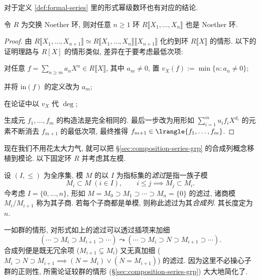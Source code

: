 对于定义 \ref{def:formal-series} 里的形式幂级数环也有对应的结论.
\begin{theorem}
	令 $R$ 为交换 Noether 环, 则对任意 $n \geq 1$ 环 $R\llbracket X_1, \ldots, X_n \rrbracket$ 也是 Noether 环.
\end{theorem}
\begin{proof}
	由 $R \llbracket X_1, \ldots, X_{n+1}\rrbracket \simeq R \llbracket X_1, \ldots, X_n \rrbracket \llbracket X_{n+1}\rrbracket$ 化约到环 $R \llbracket X \rrbracket$ 的情形. 以下的证明理路与 $R[X]$ 的情形类似, 差异在于要考虑最低次项:
	\begin{compactitem}
		\item 对任意 $f = \sum_{n \geq m} a_n X^n \in R\llbracket X \rrbracket$, 其中 $a_m \neq 0$, 置 $v_X(f) := \min\{n: a_n \neq 0\}$;
		\item 并将 $\text{in}(f)$ 的定义改为 $a_m$;
		\item 在论证中以 $v_X$ 代 $\deg$;
	\end{compactitem}
	生成元 $f_1, \ldots, f_m$ 的构造法是完全相同的. 最后一步改为用形如 $\sum_{i=1}^m u_i f_i X^{d_i}$ 的元素不断消去 $f_{m+1}$ 的最低次项, 最终推得 $f_{m+1} \in \lrangle{f_1, \ldots, f_m}$.
\end{proof}

现在我们不用花太大力气, 就可以把 \S\ref{sec:composition-series-grp} 的合成列概念移植到模论. 以下固定环 $R$ 并考虑其左模.
\begin{definition}
	设 $(I, \leq)$ 为全序集, 模 $M$ 的以 $I$ 为指标集的\emph{滤过}是指一族子模
	\[ M_i \subset M\; (i \in I), \qquad i \leq j \implies M_j \subset M_i. \]
	今考虑 $I = \{0, \ldots, n\}$, 形如 $M = M_0 \supset M_1 \supset \cdots \supset M_n = \{0\}$ 的滤过, 诸商模 $M_i/M_{i+1}$ 称为其子商. 若每个子商都是单模, 则称此滤过为其\emph{合成列}. 其长度定为 $n$.
\end{definition}
一如群的情形, 对形式如上的滤过可以透过插项来加细
\[ (\cdots \supset M_i \supset M_{i+1} \supset \cdots) \leadsto (\cdots \supset M_i \supset N \supset M_{i+1} \supset \cdots). \]
合成列便是既无冗余项 ($M_{i+1} \subsetneq M_i$) 又无真加细 ($M_i \supset N \supset M_{i+1} \implies (N=M_i) \vee (N=M_{i+1})$) 的滤过. 因为这里不必操心子群的正则性, 所需论证较群的情形 (\S\ref{sec:composition-series-grp}) 大大地简化了.

